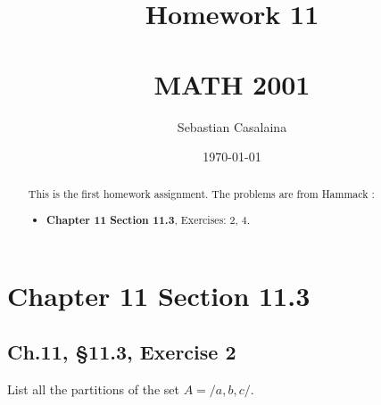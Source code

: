 \documentclass[12pt]{amsart}
\numberwithin{equation}{section}
\theoremstyle{definition}
\theoremstyle{remark}
\begin{document}




\author[Casalaina]{Sebastian Casalaina}
\address{University of Colorado, Department of Mathematics,  Campus Box 395,
Boulder, CO 80309-0395}
\date{\today}



\title[Homework 11]{Homework 11 \\ \ \\  MATH 2001}

\begin{abstract} 
This is the first homework assignment.  The problems are from Hammack \cite[Ch.~1, \S 1.1]{H13}:
\begin{itemize}

\item \textbf{Chapter 11}  
\textbf{Section 11.3}, Exercises:  2, 4.

\end{itemize}
\end{abstract}


\maketitle


\tableofcontents





\section*{Chapter 11 Section 11.3}



\subsection*{Ch.11, \S 11.3,  Exercise 2}  List all the partitions of the set  $ A = /{a, b, c /} $.
\end{document}
